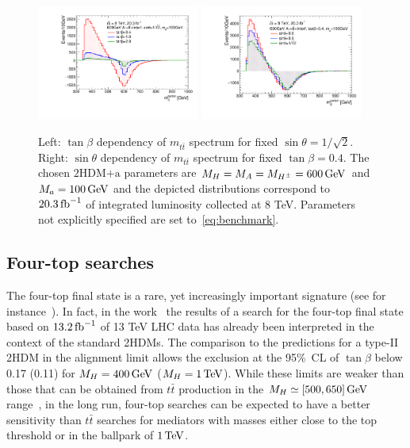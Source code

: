 \documentclass[a4paper, 11pt,notoc]{article}
\newcommand{\mA}{\ensuremath{M_{A}}\xspace}
\newcommand{\ma}{\ensuremath{M_{a}}\xspace}
\newcommand{\mH}{\ensuremath{M_{H}}\xspace}
\newcommand{\mHc}{\ensuremath{M_{H^{\pm}}}\xspace}
\newcommand{\hdma}{\ensuremath{\textrm{2HDM+a}}\xspace}
\begin{document}
\begin{figure}
\centering
\includegraphics[width=0.475\textwidth]{ttres_2HDMa_A_tanb.pdf} \quad 
\includegraphics[width=0.475\textwidth]{ttres_2HDMa_A_sinp.pdf}
\vspace{4mm}
\caption{Left: $\tan \beta$ dependency of $m_{t \bar t}$ spectrum for fixed $\sin \theta = 1/\sqrt{2}$. Right:  $\sin \theta$ dependency of $m_{t \bar t}$ spectrum for fixed $\tan \beta = 0.4$. The chosen \hdma parameters are $\mH=\mA=\mHc =600 \, {\rm GeV}$ and $\ma=100 \, {\rm GeV}$ and the depicted distributions correspond to $20.3 \, {\rm fb}^{-1}$ of integrated luminosity collected at 8 TeV. Parameters not explicitly specified are set to~\eqref{eq:benchmark}.}
\label{fig:ttres_2HDM_A}
\end{figure}

\subsection{Four-top searches}

The four-top final state is a rare, yet increasingly important signature (see for instance~\cite{ATLAS-CONF-2016-104,Sirunyan:2017roi,Aaboud:2018xuw,Hajer:2015gka,Gori:2016zto,Alvarez:2016nrz}).   In fact, in the work~\cite{ATLAS-CONF-2016-104} the results of a search for the four-top final state based on $13.2 \, {\rm fb}^{-1}$ of 13 TeV LHC data has already been interpreted in the context of the standard 2HDMs. The comparison to the predictions for a type-II 2HDM in the alignment limit allows the exclusion at the 95\%~CL of $\tan \beta$  below 0.17 (0.11) for $\mH = 400 \, {\rm GeV}$ ($\mH = 1 \, {\rm TeV}$). While these limits are weaker than those that can be obtained from $t \bar t$ production in the $M_{H} \simeq [500, 650] \, {\rm GeV}$ range~\cite{Aaboud:2017hnm}, in the long run, four-top searches can be expected to have a better sensitivity than $t \bar t$ searches for mediators with  masses either close to the top threshold or  in the ballpark of $1 \, {\rm TeV}$. 
\end{document}
